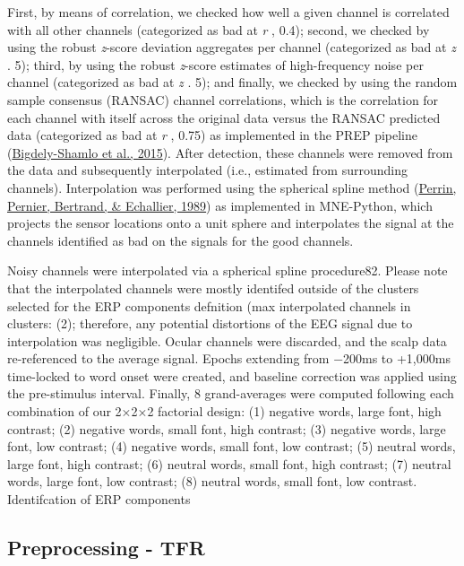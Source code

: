 \documentclass[
  man,floatsintext]{apa6}
\begin{document}
First, by means of correlation, we checked how well a given channel is correlated with all other channels (categorized as bad at \emph{r} , 0.4); second, we checked by using the robust \emph{z}-score deviation aggregates per channel (categorized as bad at \emph{z} . 5); third, by using the robust \emph{z}-score estimates of high-frequency noise per channel (categorized as bad at \emph{z} . 5); and finally, we checked by using the random sample consensus (RANSAC) channel correlations, which is the correlation for each channel with itself across the original data versus the RANSAC predicted data (categorized as bad at \emph{r} , 0.75) as implemented in the PREP pipeline (\protect\hyperlink{ref-bigdely-shamlo2015}{Bigdely-Shamlo et al., 2015}). After detection, these channels were removed from the data and subsequently interpolated (i.e., estimated from surrounding channels). Interpolation was performed using the spherical spline method (\protect\hyperlink{ref-perrin1989}{Perrin, Pernier, Bertrand, \& Echallier, 1989}) as implemented in MNE-Python, which projects the sensor locations onto a unit sphere and interpolates the signal at the channels identified as bad on the signals for the good channels.

Noisy channels were interpolated via a spherical spline procedure82. Please note that the interpolated channels were mostly identifed outside of the clusters selected for the ERP components defnition (max interpolated channels in clusters: (2); therefore, any potential distortions of the EEG signal due to interpolation was negligible. Ocular channels were discarded, and the scalp data re-referenced to the average signal. Epochs extending from −200ms to +1,000ms time-locked to word onset were created, and baseline correction was applied using the pre-stimulus interval. Finally, 8 grand-averages were computed following each combination of our 2×2×2 factorial design: (1) negative words, large font, high contrast; (2) negative words, small font, high contrast; (3) negative words, large font, low contrast; (4) negative words, small font, low contrast; (5) neutral words, large font, high contrast; (6) neutral words, small font, high contrast; (7) neutral words, large font, low contrast; (8) neutral words, small font, low contrast. Identifcation of ERP components

\hypertarget{preprocessing---tfr}{%
\subsection{Preprocessing - TFR}\label{preprocessing---tfr}}
\end{document}
